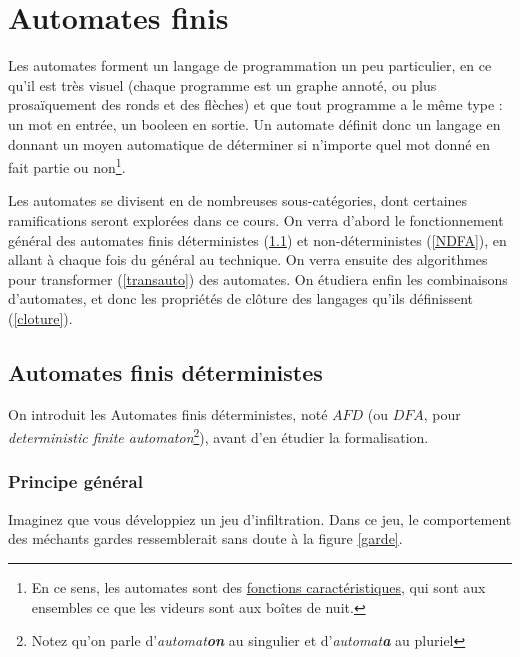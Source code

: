 \chapter{Automates finis}
\label{automates}



Les automates forment un langage de programmation un peu particulier, en ce qu'il est très visuel (chaque programme est un graphe annoté, ou plus prosaïquement des ronds et des flèches) et que tout programme a le même type : un mot en entrée, un booleen en sortie. Un automate définit donc un langage en donnant un moyen automatique de déterminer si n'importe quel mot donné en fait partie ou non\footnote{En ce sens, les automates sont des \href{https://fr.wikipedia.org/wiki/Fonction_caract\%C3\%A9ristique_(th\%C3\%A9orie_des_ensembles)}{fonctions caractéristiques}, qui sont aux ensembles ce que les videurs sont aux boîtes de nuit.}.

Les automates se divisent en de nombreuses sous-catégories, dont certaines ramifications seront explorées dans ce cours. On verra d'abord le fonctionnement général des automates finis déterministes (\ref{DFA}) et non-déterministes (\ref{NDFA}), en allant à chaque fois du général au technique. On verra ensuite des algorithmes pour transformer (\ref{transauto}) des automates. On étudiera enfin les combinaisons d'automates, et donc les propriétés de clôture des langages qu'ils définissent (\ref{cloture}).

\section{Automates finis déterministes}
\label{DFA}

On introduit les Automates finis déterministes, noté $AFD$ (ou $DFA$, pour \textit{deterministic finite automaton}\footnote{Notez qu'on parle d'\textit{automat\textbf{on}} au singulier et d'\textit{automat\textbf{a}} au pluriel}), avant d'en étudier la formalisation.


\subsection{Principe général}

Imaginez que vous développiez un jeu d'infiltration. Dans ce jeu, le comportement des méchants gardes ressemblerait sans doute à la figure \ref{garde}.

